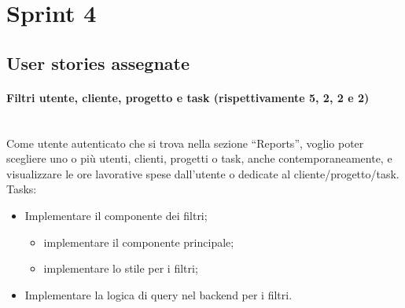 
\section{Sprint 4}
\label{sec:sprint4}

\subsection{User stories assegnate}
\paragraph{Filtri utente, cliente, progetto e task (rispettivamente 5, 2, 2 e 2)}\mbox{} \\[\baselineskip]
\noindent Come utente autenticato che si trova nella sezione “Reports”, voglio poter scegliere uno o più utenti, clienti, progetti o task, anche contemporaneamente, e visualizzare le ore lavorative spese dall'utente o dedicate al cliente/progetto/task.\\

\noindent Tasks:

\begin{itemize}
  \item Implementare il componente dei filtri;
  \begin{itemize}
    \item implementare il componente principale;
    \item implementare lo stile per i filtri;
  \end{itemize}
  \item Implementare la logica di query nel backend per i filtri.
\end{itemize}

